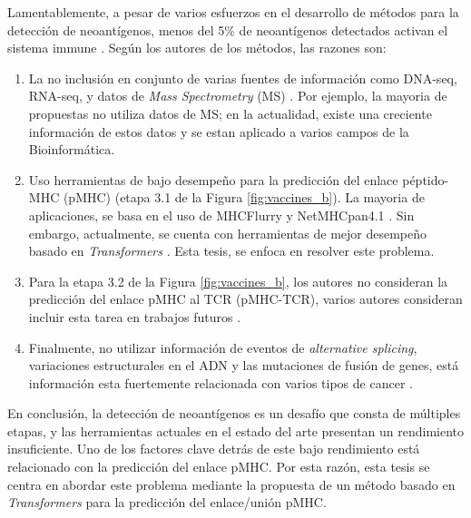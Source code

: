Lamentablemente, a pesar de varios esfuerzos en el desarrollo  de métodos para la detección de neoantígenos, menos del 5\% de neoantígenos detectados activan el sistema immune \citep{de2020neoantigen, mill2022neoms, bulik2019deep, bassani2015mass, yadav2014predicting}. Según los autores de los métodos,  las razones son: 

\begin{enumerate}
	\item La no inclusión en conjunto de varias fuentes de información como DNA-seq, RNA-seq, y datos de \textit{Mass Spectrometry} (MS) \citep{kim2018neopepsee}. Por ejemplo, la mayoria de  propuestas no utiliza datos de MS; en la actualidad, existe una creciente información de estos datos y se estan aplicado a varios campos de la Bioinformática.
	\item  Uso herramientas de bajo desempeño para la predicción del enlace péptido-MHC (pMHC) (etapa 3.1  de la Figura \ref{fig:vaccines_b}). La mayoria de aplicaciones, se basa en el uso de MHCFlurry \citep{o2020mhcflurry} y NetMHCpan4.1 \citep{reynisson2020netmhcpan}. Sin embargo, actualmente, se cuenta con herramientas de mejor desempeño basado en \textit{Transformers} \citep{arceda2023neoantigen}. Esta tesis, se enfoca en resolver este problema.
	\item Para la etapa 3.2 de la Figura \ref{fig:vaccines_b}, los autores no consideran  la predicción del enlace pMHC al TCR (pMHC-TCR), varios autores consideran incluir esta tarea en trabajos futuros  \citep{rubinsteyn2018computational}.
	\item Finalmente, no utilizar información de eventos de \textit{alternative splicing}, variaciones estructurales en el ADN y las mutaciones de fusión de genes, está información esta fuertemente relacionada con varios tipos de cancer \citep{wood2020neoepiscope}.
\end{enumerate}

En conclusión, la detección de neoantígenos es un desafío que consta de múltiples etapas, y las herramientas actuales en el estado del arte presentan un rendimiento insuficiente. Uno de los factores clave detrás de este bajo rendimiento está relacionado con la predicción del enlace pMHC. Por esta razón, esta tesis se centra en abordar este problema mediante la propuesta de un método basado en \textit{Transformers} para la predicción del enlace/unión pMHC.



